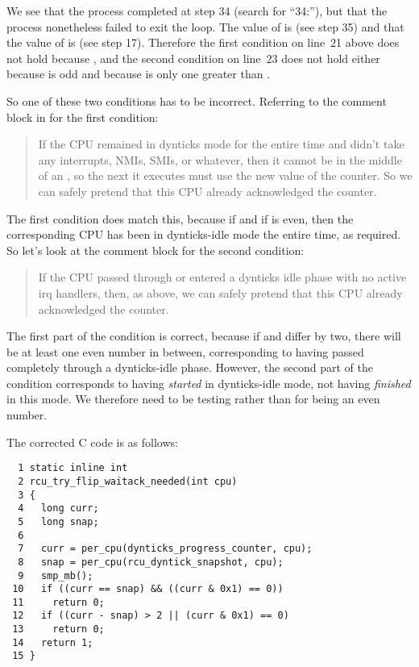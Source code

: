We see that the  process completed
at step 34 (search for ``34:''), but that the
 process nonetheless failed to exit the loop.
The value of  is  (see step 35)
and that the value of  is  (see step 17).
Therefore the first condition on line~21 above does not hold because
, and the second condition on line~23
does not hold either because  is odd and because
 is only one greater than .

So one of these two conditions has to be incorrect.
Referring to the comment block in 
for the first condition:

\begin{quote}
	If the CPU remained in dynticks mode for the entire time
	and didn't take any interrupts, NMIs, SMIs, or whatever,
	then it cannot be in the middle of an , so
	the next  it executes must use the new value
	of the counter.  So we can safely pretend that this CPU
	already acknowledged the counter.
\end{quote}

The first condition does match this, because if 
and if  is even, then the corresponding CPU has been
in dynticks-idle mode the entire time, as required.
So let's look at the comment block for the second condition:

\begin{quote}
	If the CPU passed through or entered a dynticks idle phase with
	no active irq handlers, then, as above, we can safely pretend
	that this CPU already acknowledged the counter.
\end{quote}

The first part of the condition is correct, because if 
and  differ by two, there will be at least one even
number in between, corresponding to having passed completely through
a dynticks-idle phase.
However, the second part of the condition corresponds to having
\emph{started} in dynticks-idle mode, not having \emph{finished}
in this mode.
We therefore need to be testing  rather than
 for being an even number.

The corrected C code is as follows:

{ \scriptsize
\begin{verbatim}
  1 static inline int
  2 rcu_try_flip_waitack_needed(int cpu)
  3 {
  4   long curr;
  5   long snap;
  6
  7   curr = per_cpu(dynticks_progress_counter, cpu);
  8   snap = per_cpu(rcu_dyntick_snapshot, cpu);
  9   smp_mb();
 10   if ((curr == snap) && ((curr & 0x1) == 0))
 11     return 0;
 12   if ((curr - snap) > 2 || (curr & 0x1) == 0)
 13     return 0;
 14   return 1;
 15 }
\end{verbatim}
}

